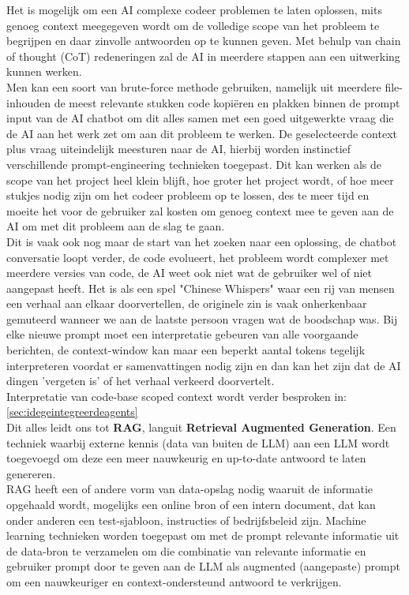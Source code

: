 Het is mogelijk om een AI complexe codeer problemen te laten oplossen, mits genoeg context meegegeven wordt om de volledige scope van het probleem te begrijpen en daar zinvolle antwoorden op te kunnen geven. Met behulp van chain of thought (CoT) redeneringen zal de AI in meerdere stappen aan een uitwerking kunnen werken. \\

Men kan een soort van brute-force methode gebruiken, namelijk uit meerdere file-inhouden de meest relevante stukken code kopiëren en plakken binnen de prompt input van de AI chatbot om dit alles samen met een goed uitgewerkte vraag die de AI aan het werk zet om aan dit probleem te werken. De geselecteerde context plus vraag uiteindelijk meesturen naar de AI, hierbij worden instinctief verschillende prompt-engineering technieken toegepast. Dit kan werken als de scope van het project heel klein blijft, hoe groter het project wordt, of hoe meer stukjes nodig zijn om het codeer probleem op te lossen, des te meer tijd en moeite het voor de gebruiker zal kosten om genoeg context mee te geven aan de AI om met dit probleem aan de slag te gaan. \\

Dit is vaak ook nog maar de start van het zoeken naar een oplossing, de chatbot conversatie loopt verder, de code evolueert, het probleem wordt complexer met meerdere versies van code, de AI weet ook niet wat de gebruiker wel of niet aangepast heeft. Het is als een spel "Chinese Whispers" waar een rij van mensen een verhaal aan elkaar doorvertellen, de originele zin is vaak onherkenbaar gemuteerd wanneer we aan de laatste persoon vragen wat de boodschap was. Bij elke nieuwe prompt moet een interpretatie gebeuren van alle voorgaande berichten, de context-window kan maar een beperkt aantal tokens tegelijk interpreteren voordat er samenvattingen nodig zijn en dan kan het zijn dat de AI dingen 'vergeten is' of het verhaal verkeerd doorvertelt. \\

Interpretatie van code-base scoped context wordt verder besproken in: \ref{sec:idegeintegreerdeagents} \\

Dit alles leidt ons tot \textbf{RAG}, languit \textbf{Retrieval Augmented Generation}. Een techniek waarbij externe kennis (data van buiten de LLM) aan een LLM wordt toegevoegd om deze een meer nauwkeurig en up-to-date antwoord te laten genereren. \\

RAG heeft een of andere vorm van data-opslag nodig waaruit de informatie opgehaald wordt, mogelijks een online bron of een intern document, dat kan onder anderen een test-sjabloon, instructies of bedrijfsbeleid zijn. Machine learning technieken worden toegepast om met de prompt relevante informatie uit de data-bron te verzamelen om die combinatie van relevante informatie en gebruiker prompt door te geven aan de LLM als augmented (aangepaste) prompt om een nauwkeuriger en context-ondersteund antwoord te verkrijgen. \\


